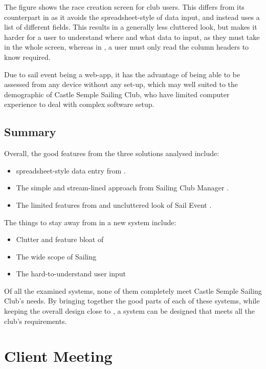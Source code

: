 \documentclass{l4proj}
\begin{document}
The figure shows the race creation screen for club users. This differs from its counterpart in \citet{sailwave} as it avoids the spreadsheet-style of data input, and instead uses a list of different fields. This results in a generally less cluttered look, but makes it harder for a user to understand where and what data to input, as they must take in the whole screen, whereas in \citet{sailwave}, a user must only read the column headers to know required.

Due to sail event being a web-app, it has the advantage of being able to be assessed from any device without any set-up, which may well suited to the demographic of Castle Semple Sailing Club, who have limited computer experience to deal with complex software setup.

\subsection{Summary}

Overall, the good features from the three solutions analysed include:
\begin{itemize}
    \item
    spreadsheet-style data entry from \citet{sailwave}.
    \item
    The simple and stream-lined approach from Sailing Club Manager \citet{ClubManager}.
    \item
    The limited features from and uncluttered look of Sail Event \citet{SailEvent}.
\end{itemize}

The things to stay away from in a new system include:
\begin{itemize}
    \item
    Clutter and feature bloat of \citet{sailwave} 
    \item
    The wide scope of Sailing \citet{ClubManager}
    \item
    The hard-to-understand user input \citet{SailEvent}
\end{itemize}

Of all the examined systems, none of them completely meet Castle Semple Sailing Club's needs. By bringing together the good parts of each of these systems, while keeping the overall design close to \citet{sailwave}, a system can be designed that meets all the club's requirements.

\section{Client Meeting}
\end{document}
